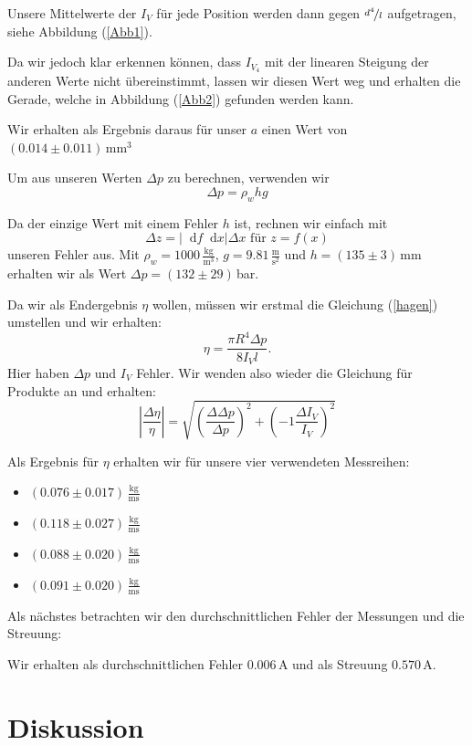\documentclass[11pt,a4paper]{article}
\newcommand\dif{\mathop{}\!\mathrm{d}}
\begin{document}
Unsere Mittelwerte der $I_V$ f\"ur jede Position werden dann gegen $\nicefrac{d^4}{l}$ aufgetragen, siehe Abbildung (\ref{Abb1}).

Da wir jedoch klar erkennen k\"onnen, dass $I_{V_4}$ mit der linearen Steigung der anderen Werte nicht \"ubereinstimmt, lassen wir diesen Wert weg und erhalten die Gerade, welche in Abbildung (\ref{Abb2}) gefunden werden kann.

Wir erhalten als Ergebnis daraus f\"ur unser $a$ einen Wert von $(0.014\pm0.011)\,\mathrm{mm}^3$

Um aus unseren Werten $\Delta p$ zu berechnen, verwenden wir
$$
\Delta p=\rho_w hg
$$

Da der einzige Wert mit einem Fehler $h$ ist, rechnen wir einfach mit
$$
\Delta z=\left|{\dif f}{\dif x}\right|\Delta x\textrm{ f\"ur }z=f(x)
$$
unseren Fehler aus.
Mit $\rho_w=1000\,\frac{\mathrm{kg}}{\mathrm{m}^3}$, $g=9.81\,\frac{\mathrm{m}}{\mathrm{s}^2}$ und $h=(135\pm3)\,\mathrm{mm}$ erhalten wir als Wert $\Delta p=(132\pm29)\,$bar.

Da wir als Endergebnis $\eta$ wollen, m\"ussen wir erstmal die Gleichung (\ref{hagen}) umstellen und wir erhalten:
$$
\eta=\frac{\pi R^4\Delta p}{8I_V l}.
$$
Hier haben $\Delta p$ und $I_V$ Fehler. Wir wenden also wieder die Gleichung f\"ur Produkte an und erhalten:
$$
\left\vert\frac{\Delta\eta}{\eta}\right\vert=\sqrt{\left(\frac{\Delta\Delta p}{\Delta p}\right)^2+\left(-1\frac{\Delta I_V}{I_V}\right)^2}
$$

Als Ergebnis f\"ur $\eta$ erhalten wir f\"ur unsere vier verwendeten Messreihen:
\begin{itemize}
\item $(0.076\pm0.017)\,\mathrm{\frac{kg}{ms}}$
\item $(0.118\pm0.027)\,\mathrm{\frac{kg}{ms}}$
\item $(0.088\pm0.020)\,\mathrm{\frac{kg}{ms}}$
\item $(0.091\pm0.020)\,\mathrm{\frac{kg}{ms}}$
\end{itemize}


Als n\"achstes betrachten wir den durchschnittlichen Fehler der Messungen und die Streuung:

Wir erhalten als durchschnittlichen Fehler $0.006\,$A und als Streuung $0.570\,$A.

\section{Diskussion}
\end{document}
